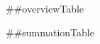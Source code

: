 \documentclass[11pt]{article}%
\begin{document}
##overviewTable

\newpage

##summationTable
\end{document}
